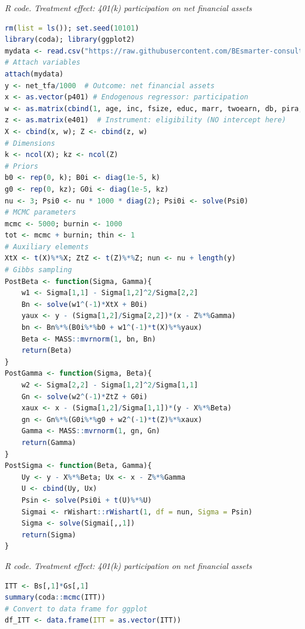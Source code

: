 \begin{enumerate}[leftmargin=*]
\begin{tcolorbox}[enhanced,width=4.67in,center upper,
	fontupper=\large\bfseries,drop shadow southwest,sharp corners]\label{code1_chap12}
	\textit{R code. Treatment effect: 401(k) participation on net financial assets}
	\begin{VF}
		\begin{lstlisting}[language=R]		
rm(list = ls()); set.seed(10101)
library(coda); library(ggplot2)
mydata <- read.csv("https://raw.githubusercontent.com/BEsmarter-consultancy/BSTApp/refs/heads/master/DataApp/401k.csv", sep = ",", header = TRUE, quote = "")
# Attach variables
attach(mydata)
y <- net_tfa/1000  # Outcome: net financial assets
x <- as.vector(p401) # Endogenous regressor: participation
w <- as.matrix(cbind(1, age, inc, fsize, educ, marr, twoearn, db, pira, hown))  # Exogenous regressors with intercept
z <- as.matrix(e401)  # Instrument: eligibility (NO intercept here)
X <- cbind(x, w); Z <- cbind(z, w)
# Dimensions
k <- ncol(X); kz <- ncol(Z)  
# Priors
b0 <- rep(0, k); B0i <- diag(1e-5, k)
g0 <- rep(0, kz); G0i <- diag(1e-5, kz)
nu <- 3; Psi0 <- nu * 1000 * diag(2); Psi0i <- solve(Psi0)
# MCMC parameters
mcmc <- 5000; burnin <- 1000
tot <- mcmc + burnin; thin <- 1
# Auxiliary elements
XtX <- t(X)%*%X; ZtZ <- t(Z)%*%Z; nun <- nu + length(y)
# Gibbs sampling
PostBeta <- function(Sigma, Gamma){
	w1 <- Sigma[1,1] - Sigma[1,2]^2/Sigma[2,2]
	Bn <- solve(w1^(-1)*XtX + B0i)
	yaux <- y - (Sigma[1,2]/Sigma[2,2])*(x - Z%*%Gamma)
	bn <- Bn%*%(B0i%*%b0 + w1^(-1)*t(X)%*%yaux)
	Beta <- MASS::mvrnorm(1, bn, Bn)
	return(Beta)
}
PostGamma <- function(Sigma, Beta){
	w2 <- Sigma[2,2] - Sigma[1,2]^2/Sigma[1,1]
	Gn <- solve(w2^(-1)*ZtZ + G0i)
	xaux <- x - (Sigma[1,2]/Sigma[1,1])*(y - X%*%Beta)
	gn <- Gn%*%(G0i%*%g0 + w2^(-1)*t(Z)%*%xaux)
	Gamma <- MASS::mvrnorm(1, gn, Gn)
	return(Gamma)
}
PostSigma <- function(Beta, Gamma){
	Uy <- y - X%*%Beta; Ux <- x - Z%*%Gamma
	U <- cbind(Uy, Ux)
	Psin <- solve(Psi0i + t(U)%*%U)
	Sigmai <- rWishart::rWishart(1, df = nun, Sigma = Psin)
	Sigma <- solve(Sigmai[,,1]) 
	return(Sigma)
}
\end{lstlisting}
	\end{VF}
\end{tcolorbox} 

\begin{tcolorbox}[enhanced,width=4.67in,center upper,
	fontupper=\large\bfseries,drop shadow southwest,sharp corners]\label{code1a_chap12}
	\textit{R code. Treatment effect: 401(k) participation on net financial assets}
	\begin{VF}
		\begin{lstlisting}[language=R]		
ITT <- Bs[,1]*Gs[,1]
summary(coda::mcmc(ITT))
# Convert to data frame for ggplot
df_ITT <- data.frame(ITT = as.vector(ITT))


\end{lstlisting}
\end{VF}
\end{tcolorbox}
\end{enumerate}
